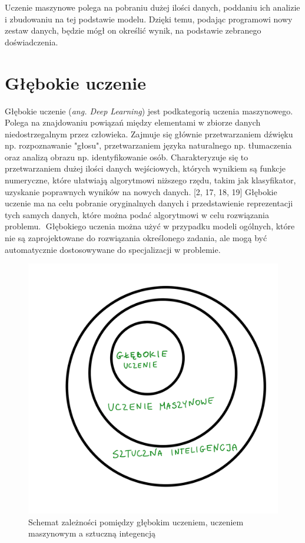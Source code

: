 \documentclass[brudnopis]{xmgr}
\begin{document}
Uczenie maszynowe polega na pobraniu dużej ilości danych, poddaniu ich analizie i zbudowaniu na tej podstawie modelu. Dzięki temu, podając programowi nowy zestaw danych, będzie mógł on określić wynik, na podstawie zebranego doświadczenia. 

\section{Głębokie uczenie }

Głębokie uczenie (\textit{ang. Deep Learning}) jest podkategorią uczenia maszynowego. Polega na znajdowaniu powiązań między elementami w zbiorze danych niedostrzegalnym przez człowieka. Zajmuje się głównie przetwarzaniem dźwięku np. rozpoznawanie "głosu", przetwarzaniem języka naturalnego np. tłumaczenia oraz analizą obrazu np. identyfikowanie osób. Charakteryzuje się to przetwarzaniem dużej ilości danych wejściowych, których wynikiem są funkcje numeryczne, które ułatwiają algorytmowi niższego rzędu, takim jak klasyfikator, uzyskanie poprawnych wyników na nowych danych. [2, 17, 18, 19] Głębokie uczenie ma na celu pobranie oryginalnych danych i przedstawienie reprezentacji tych samych danych, które można podać algorytmowi w celu rozwiązania problemu. 
􏰁Głębokiego uczenia można użyć w przypadku modeli ogólnych, które nie są zaprojektowane do rozwiązania określonego zadania, ale mogą być automatycznie dostosowywane do specjalizacji w problemie.

\begin{figure}[!tbh]
\centering
\includegraphics[width=.8\hsize]{fig/1}
\caption{Schemat zależności pomiędzy głębokim uczeniem, uczeniem maszynowym a sztuczną integencją\label{RYS.1}}
\end{figure}
\end{document}
